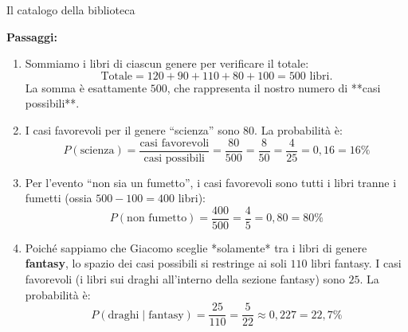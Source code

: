 \begin{esercizio}{Il catalogo della biblioteca}
\responsespace{3.0cm}

\begin{soluzione}
  \textbf{Passaggi:}
  \begin{enumerate}[label=\alph*)]
    \item Sommiamo i libri di ciascun genere per verificare il totale:
    \[
    \text{Totale} = 120 + 90 + 110 + 80 + 100 = 500 \text{ libri}.
    \]
    La somma è esattamente $500$, che rappresenta il nostro numero di **casi possibili**.
    \item I casi favorevoli per il genere ``scienza'' sono $80$. La probabilità è:
    \[
    P(\text{scienza}) = \frac{\text{casi favorevoli}}{\text{casi possibili}} = \frac{80}{500} = \frac{8}{50} = \frac{4}{25} = 0{,}16 = 16\%
    \]
    \item Per l'evento ``non sia un fumetto'', i casi favorevoli sono tutti i libri tranne i fumetti (ossia $500 - 100 = 400$ libri):
    \[
    P(\text{non fumetto}) = \frac{400}{500} = \frac{4}{5} = 0{,}80 = 80\%
    \]
    \item Poiché sappiamo che Giacomo sceglie *solamente* tra i libri di genere \textbf{fantasy}, lo spazio dei casi possibili si restringe ai soli $110$ libri fantasy.
    I casi favorevoli (i libri sui draghi all'interno della sezione fantasy) sono $25$. La probabilità è:
    \[
    P(\text{draghi} \mid \text{fantasy}) = \frac{25}{110} = \frac{5}{22} \approx 0{,}227 = 22{,}7\%
    \]
  \end{enumerate}
\end{soluzione}
\end{esercizio}

\condnewpage

